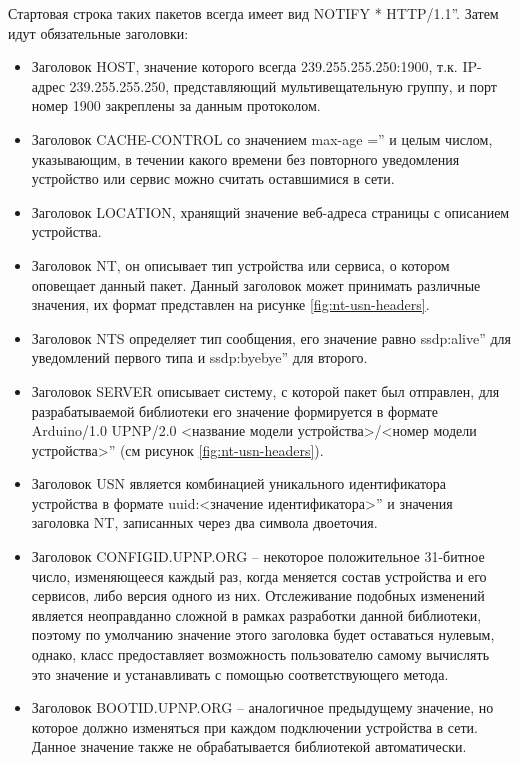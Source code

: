 Стартовая строка таких пакетов всегда имеет вид NOTIFY * HTTP/1.1''.
Затем идут обязательные заголовки: 
\begin{itemize} 
	\item Заголовок HOST, значение которого всегда 239.255.255.250:1900, т.к.
	IP-адрес 239.255.255.250, представляющий мультивещательную группу, и порт номер 1900 закреплены за данным протоколом.
	\item Заголовок CACHE-CONTROL со значением max-age ='' и целым числом, указывающим, в течении какого времени без повторного уведомления устройство или сервис можно считать оставшимися в сети.
	\item Заголовок LOCATION, хранящий значение веб-адреса страницы с описанием устройства.
	\item Заголовок NT, он описывает тип устройства или сервиса, о котором оповещает данный пакет.
	Данный заголовок может принимать различные значения, их формат представлен на рисунке \ref{fig:nt-usn-headers}.
	\item Заголовок NTS определяет тип сообщения, его значение равно ssdp:alive'' для уведомлений первого типа и ssdp:byebye'' для второго.
	\item Заголовок SERVER описывает систему, с которой пакет был отправлен, для разрабатываемой библиотеки его значение формируется в формате Arduino/1.0 UPNP/2.0 <название модели устройства>/<номер модели устройства>'' (см рисунок \ref{fig:nt-usn-headers}).
	\item Заголовок USN является комбинацией уникального идентификатора устройства в формате uuid:<значение идентификатора>'' и значения заголовка NT, записанных через два символа двоеточия.
	\item Заголовок CONFIGID.UPNP.ORG – некоторое положительное 31-битное число, изменяющееся каждый раз, когда меняется состав устройства и его сервисов, либо версия одного из них.
Отслеживание подобных изменений является неоправданно сложной в рамках разработки данной библиотеки, поэтому по умолчанию значение этого заголовка будет оставаться нулевым, однако, класс предоставляет возможность пользователю самому вычислять это значение и устанавливать с помощью соответствующего метода.
	\item Заголовок BOOTID.UPNP.ORG – аналогичное предыдущему значение, но которое должно изменяться при каждом подключении устройства в сети.
Данное значение также не обрабатывается библиотекой автоматически.
\end{itemize}


